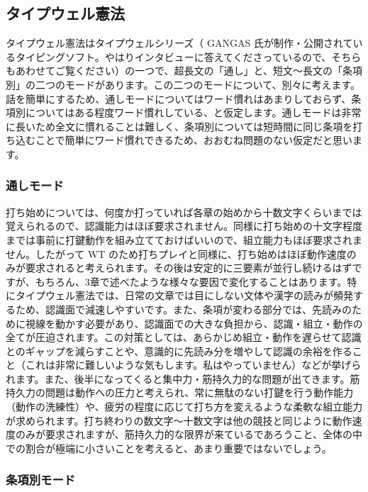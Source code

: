 \subsection{タイプウェル憲法}

タイプウェル憲法はタイプウェルシリーズ（ GANGAS 氏が制作・公開されているタイピングソフト。やはりインタビューに答えてくださっているので、そちらもあわせてご覧ください）の一つで、超長文の「通し」と、短文～長文の「条項別」の二つのモードがあります。この二つのモードについて、別々に考えます。話を簡単にするため、通しモードについてはワード慣れはあまりしておらず、条項別についてはある程度ワード慣れしている、と仮定します。通しモードは非常に長いため全文に慣れることは難しく、条項別については短時間に同じ条項を打ち込むことで簡単にワード慣れできるため、おおむね問題のない仮定だと思います。

\subsubsection*{通しモード}

打ち始めについては、何度か打っていれば各章の始めから十数文字くらいまでは覚えられるので、認識能力はほぼ要求されません。同様に打ち始めの十文字程度までは事前に打鍵動作を組み立てておけばいいので、組立能力もほぼ要求されません。したがって WT のため打ちプレイと同様に、打ち始めはほぼ動作速度のみが要求されると考えられます。その後は安定的に三要素が並行し続けるはずですが、もちろん、3章で述べたような様々な要因で変化することはあります。特にタイプウェル憲法では、日常の文章では目にしない文体や漢字の読みが頻発するため、認識面で減速しやすいです。また、条項が変わる部分では、先読みのために視線を動かす必要があり、認識面での大きな負担から、認識・組立・動作の全てが圧迫されます。この対策としては、あらかじめ組立・動作を遅らせて認識とのギャップを減らすことや、意識的に先読み分を増やして認識の余裕を作ること（これは非常に難しいような気もします。私はやっていません）などが挙げられます。また、後半になってくると集中力・筋持久力的な問題が出てきます。筋持久力の問題は動作への圧力と考えられ、常に無駄のない打鍵を行う動作能力（動作の洗練性）や、疲労の程度に応じて打ち方を変えるような柔軟な組立能力が求められます。打ち終わりの数文字～十数文字は他の競技と同じように動作速度のみが要求されますが、筋持久力的な限界が来ているであろうこと、全体の中での割合が極端に小さいことを考えると、あまり重要ではないでしょう。

\subsubsection*{条項別モード}

